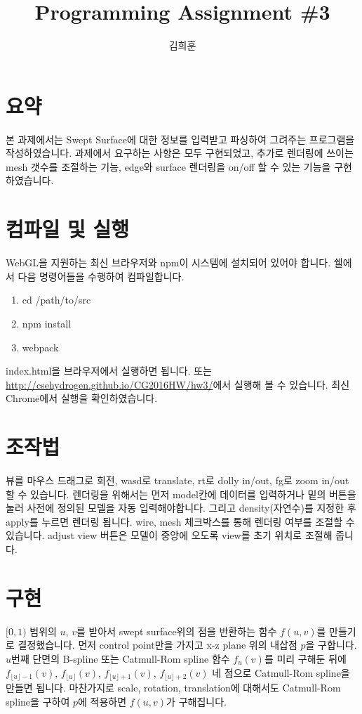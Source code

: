 \documentclass[11pt]{article}
\begin{document}
\title{Programming Assignment \#3}
\author{김희훈}
\maketitle

\section{요약}

본 과제에서는 Swept Surface에 대한 정보를 입력받고 파싱하여 그려주는 프로그램을 작성하였습니다.
과제에서 요구하는 사항은 모두 구현되었고, 추가로 렌더링에 쓰이는 mesh 갯수를 조절하는 기능, edge와 surface 렌더링을 on/off 할 수 있는 기능을 구현하였습니다.

\section{컴파일 및 실행}

WebGL을 지원하는 최신 브라우저와 npm이 시스템에 설치되어 있어야 합니다.
쉘에서 다음 명령어들을 수행하여 컴파일합니다.

\begin{enumerate}
  \item cd /path/to/src
  \item npm install
  \item webpack
\end{enumerate}

index.html을 브라우저에서 실행하면 됩니다.
또는 \url{http://csehydrogen.github.io/CG2016HW/hw3/}에서 실행해 볼 수 있습니다.
최신 Chrome에서 실행을 확인하였습니다.

\section{조작법}

뷰를 마우스 드래그로 회전, wasd로 translate, rt로 dolly in/out, fg로 zoom in/out 할 수 있습니다.
렌더링을 위해서는 먼저 model칸에 데이터를 입력하거나 밑의 버튼을 눌러 사전에 정의된 모델을 자동 입력해야합니다.
그리고 density(자연수)를 지정한 후 apply를 누르면 렌더링 됩니다.
wire, mesh 체크박스를 통해 렌더링 여부를 조절할 수 있습니다.
adjust view 버튼은 모델이 중앙에 오도록 view를 초기 위치로 조절해 줍니다.

\section{구현}

$[0,1)$ 범위의 $u$, $v$를 받아서 swept surface위의 점을 반환하는 함수 $f(u, v)$를 만들기로 결정했습니다.
먼저 control point만을 가지고 x-z plane 위의 내삽점 $p$을 구합니다.
$u$번째 단면의 B-spline 또는 Catmull-Rom spline 함수 $f_u(v)$를 미리 구해둔 뒤에 $f_{\lfloor u\rfloor -1}(v)$, $f_{\lfloor u\rfloor}(v)$, $f_{\lfloor u\rfloor +1}(v)$, $f_{\lfloor u\rfloor +2}(v)$ 네 점으로 Catmull-Rom spline을 만들면 됩니다.
마찬가지로 scale, rotation, translation에 대해서도 Catmull-Rom spline을 구하여 $p$에 적용하면 $f(u,v)$가 구해집니다.
\end{document}
